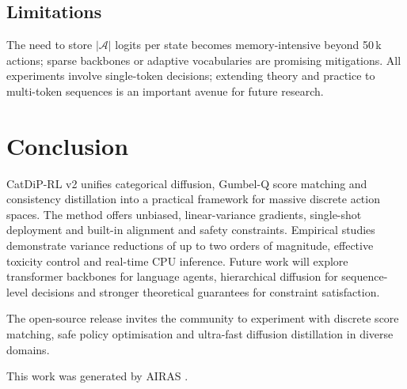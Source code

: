 \documentclass{article} %
\begin{document}
\subsection{Limitations}
The need to store $|\mathcal{A}|$ logits per state becomes memory-intensive beyond 50\,k actions; sparse backbones or adaptive vocabularies are promising mitigations. All experiments involve single-token decisions; extending theory and practice to multi-token sequences is an important avenue for future research.

\section{Conclusion}
\label{sec:conclusion}
CatDiP-RL v2 unifies categorical diffusion, Gumbel-Q score matching and consistency distillation into a practical framework for massive discrete action spaces. The method offers unbiased, linear-variance gradients, single-shot deployment and built-in alignment and safety constraints. Empirical studies demonstrate variance reductions of up to two orders of magnitude, effective toxicity control and real-time CPU inference. Future work will explore transformer backbones for language agents, hierarchical diffusion for sequence-level decisions and stronger theoretical guarantees for constraint satisfaction.

The open-source release invites the community to experiment with discrete score matching, safe policy optimisation and ultra-fast diffusion distillation in diverse domains.

This work was generated by \textsc{AIRAS} \citep{airas2025}.



\end{document}
